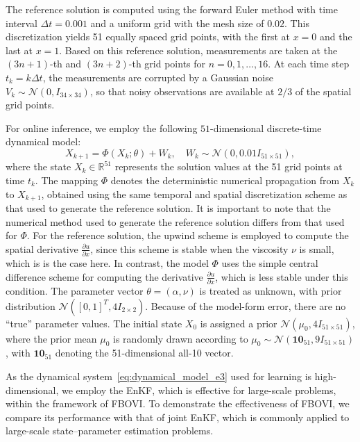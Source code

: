 \documentclass[preprint,3p,times]{elsarticle}
\begin{document}
The reference solution is computed using the forward Euler method with time interval $\Delta t = 0.001$ and a uniform grid with the mesh size of $0.02$. This discretization yields 51 equally spaced grid points, with the first at $x=0$ and the last at $x=1$. Based on this reference solution, measurements are taken at the $(3n+1)$-th and $(3n+2)$-th grid points for $n=0,1,\ldots,16$. At each time step $t_k = k \Delta t$, the measurements are corrupted by a Gaussian noise $V_k \sim \mathcal{N}(0, I_{34 \times 34})$, so that noisy observations are available at $2/3$ of the spatial grid points.

For online inference, we employ the following $51$-dimensional discrete-time dynamical model:
\begin{equation}
X_{k+1} = \Phi(X_k;\theta) + W_k, 
\quad W_k \sim \mathcal{N}(0, 0.01 I_{51 \times 51}), 
\label{eq:dynamical_model_e3}
\end{equation}
where the state $X_k \in \mathbb{R}^{51}$ represents the solution values at the 51 grid points at time $t_k$. The mapping $\Phi$ denotes the deterministic numerical propagation from $X_k$ to $X_{k+1}$, obtained using the same temporal and spatial discretization scheme as that used to generate the reference solution. It is important to note that the numerical method used to generate the reference solution differs from that used for $\Phi$. For the reference solution, the upwind scheme is employed to compute the spatial derivative $\frac{\partial u}{\partial x}$, since this scheme is stable when the viscosity $\nu$ is small, which is is the case here. In contrast, the model $\Phi$ uses the simple central difference scheme for computing the derivative $\frac{\partial u}{\partial x}$, which is less stable under this condition. The parameter vector $\theta = (\alpha, \nu)$ is treated as unknown, with prior distribution $\mathcal{N}([0,1]^T, 4I_{2 \times 2})$. Because of the model-form error, there are no “true” parameter values. The initial state $X_0$ is assigned a prior $\mathcal{N}(\mu_0, 4I_{51 \times 51})$, where the prior mean $\mu_0$ is randomly drawn according to $\mu_0 \sim \mathcal{N}(\mathbf{10}_{51}, 9I_{51 \times 51})$, with $\mathbf{10}_{51}$ denoting the 51-dimensional all-10 vector.

As the dynamical system~\eqref{eq:dynamical_model_e3} used for learning is high-dimensional, we employ the EnKF,  which is effective for large-scale problems, within the framework of FBOVI. To demonstrate the effectiveness of FBOVI, we compare its performance with that of joint EnKF, which is commonly applied to large-scale state–parameter estimation problems.  
\end{document}
